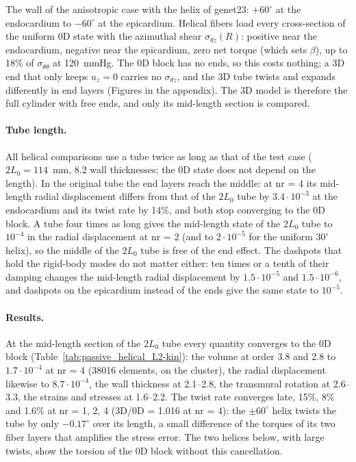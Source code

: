 The wall of the anisotropic case with the helix of genet23: $+60^\circ$ at the endocardium to $-60^\circ$
at the epicardium. Helical fibers load every cross-section of the uniform 0D state with
the azimuthal shear $\sigma_{\theta z}(R)$: positive near the endocardium, negative near the
epicardium, zero net torque (which sets $\beta$), up to 18\% of $\sigma_{\theta\theta}$ at
120~mmHg. The 0D block has no ends, so this costs nothing; a 3D end that only keeps
$u_z = 0$ carries no $\sigma_{\theta z}$, and the 3D tube twists and expands differently
in end layers (Figures in the appendix). The 3D model is therefore the full cylinder
with free ends, and only its mid-length section is compared.

\paragraph{Tube length.} All helical comparisons use a tube twice as long as that of the
test case ($2L_0 = 114$~mm, 8.2 wall thicknesses; the 0D state does not depend on the
length). In the original tube the end layers reach the middle: at nr = 4 its mid-length
radial displacement differs from that of the $2L_0$ tube by $3.4\cdot10^{-3}$ at the
endocardium and its twist rate by 14\%, and both stop converging to the 0D block. A tube
four times as long gives the mid-length state of the $2L_0$ tube to $10^{-4}$ in the radial
displacement at nr = 2 (and to $2\cdot10^{-5}$ for the uniform $30^\circ$ helix), so the
middle of the $2L_0$ tube is free of the end effect. The dashpots that hold the rigid-body
modes do not matter either: ten times or a tenth of their damping changes the mid-length
radial displacement by $1.5\cdot10^{-5}$ and $1.5\cdot10^{-6}$, and dashpots on the
epicardium instead of the ends give the same state to $10^{-5}$.

\paragraph{Results.} At the mid-length section of the $2L_0$ tube every quantity converges
to the 0D block (Table~\ref{tab:passive_helical_L2-kin}): the volume at order 3.8 and 2.8 to
$1.7\cdot10^{-4}$ at nr = 4 (38016 elements, on the cluster), the radial displacement likewise
to $8.7\cdot10^{-4}$, the wall thickness at 2.1--2.8, the transmural rotation at 2.6--3.3, the
strains and stresses at 1.6--2.2. The twist rate converges late, 15\%, 8\% and 1.6\% at
nr = 1, 2, 4 (3D/0D = 1.016 at nr = 4): the $\pm60^\circ$ helix twists the tube by only
$-0.17^\circ$ over its length, a small difference of the torques of its two fiber layers
that amplifies the stress error. The two helices below, with large twists, show the
torsion of the 0D block without this cancellation.
